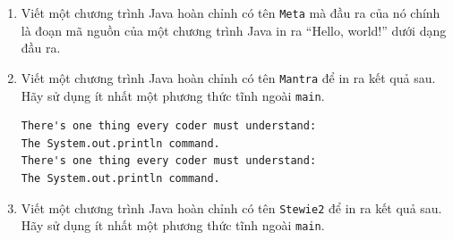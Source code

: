 \begin{enumerate}
\begin{verbatim}
A "quoted" String is
'much' better if you learn
the rules of "escape sequences."
Also, "" represents an empty String.
Don't forget: use \" instead of " !
'' is not the same as "
\end{verbatim}
\item
  Viết một chương trình Java hoàn chỉnh có tên \texttt{Meta} mà đầu ra
  của nó chính là đoạn mã nguồn của một chương trình Java in ra ``Hello,
  world!'' dưới dạng đầu ra.
\item
  Viết một chương trình Java hoàn chỉnh có tên \texttt{Mantra} để in ra
  kết quả sau. Hãy sử dụng ít nhất một phương thức tĩnh ngoài
  \texttt{main}.

\begin{verbatim}
There's one thing every coder must understand:
The System.out.println command.
There's one thing every coder must understand:
The System.out.println command.
\end{verbatim}
\item
  Viết một chương trình Java hoàn chỉnh có tên \texttt{Stewie2} để in ra
  kết quả sau. Hãy sử dụng ít nhất một phương thức tĩnh ngoài
  \texttt{main}.


\end{enumerate}
